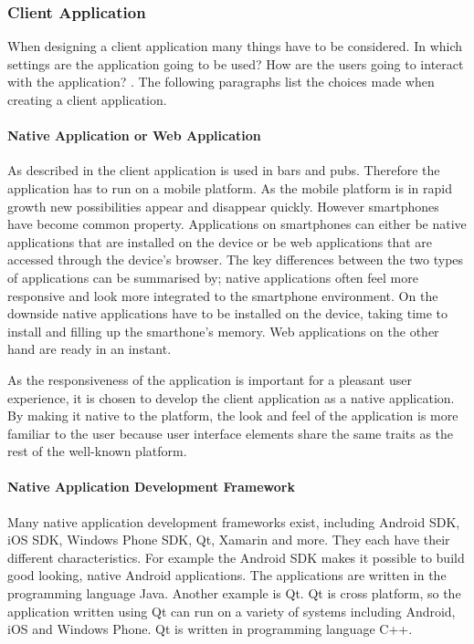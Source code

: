 \subsubsection{Client Application}
\label{ssub:client_application}

When designing a client application many things have to be considered. In which settings are the application going to be used? How are the users going to interact with the application? . The following paragraphs list the choices made when creating a client application.

\paragraph{Native Application or Web Application}
\label{par:native_application_or_web_application}

As described in  the client application is used in bars and pubs. Therefore the application has to run on a mobile platform. As the mobile platform is in rapid growth new possibilities appear and disappear quickly. However smartphones have become common property. Applications on smartphones can either be native applications that are installed on the device or be web applications that are accessed through the device's browser. The key differences between the two types of applications can be summarised by; native applications often feel more responsive and look more integrated to the smartphone environment. On the downside native applications have to be installed on the device, taking time to install and filling up the smarthone's memory. Web applications on the other hand are ready in an instant.

As the responsiveness of the application is important for a pleasant user experience, it is chosen to develop the client application as a native application. By making it native to the platform, the look and feel of the application is more familiar to the user because user interface elements share the same traits as the rest of the well-known platform.

\paragraph{Native Application Development Framework}
\label{par:native_application_development_framework}

Many native application development frameworks exist, including Android SDK, iOS SDK, Windows Phone SDK, Qt, Xamarin and more. They each have their different characteristics. For example the Android SDK makes it possible to build good looking, native Android applications. The applications are written in the programming language Java. Another example is Qt. Qt is cross platform, so the application written using Qt can run on a variety of systems including Android, iOS and Windows Phone. Qt is written in programming language C++.

